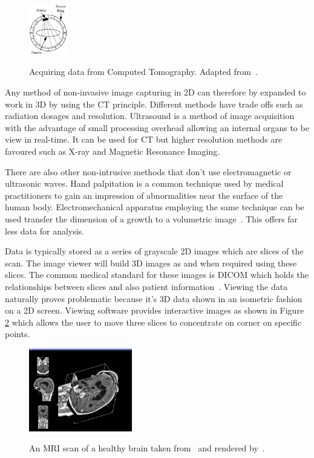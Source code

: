 \documentclass[journal]{IEEEtran}
\begin{document}
\begin{figure}[!htb]
   \centering
   \includegraphics[width = 0.15\textwidth]{Figures/CT.pdf}
   \label{fig:ct}
   \caption{Acquiring data from Computed Tomography. Adapted from~\cite{kayvan2006biomedical}.}
\end{figure}

Any method of non-invasive image capturing in 2D can therefore by expanded to work in 3D by using the CT principle.
Different methods have trade offs such as radiation dosages and resolution.
Ultrasound is a method of image acquisition with the advantage of small processing overhead allowing an internal organs to be view in real-time. 
It can be used for CT but higher resolution methods are favoured such as X-ray and Magnetic Resonance Imaging.

There are also other non-intrusive methods that don't use electromagnetic or ultrasonic waves.
Hand palpitation is a common technique used by medical practitioners to gain an impression of abnormalities near the surface of the human body. 
Electromechanical apparatus employing the same technique can be used transfer the dimension of a growth to a volumetric image~\cite{liu09haptic,wellman1997modeling}.  
This offers far less data for analysis.

Data is typically stored as a series of grayscale 2D images which are slices of the scan.
The image viewer will build 3D images as and when required using these slices.
The common medical standard for these images is DICOM which holds the relationships between slices and also patient information~\cite{dicom11nema}.
Viewing the data naturally proves problematic because it's 3D data shown in an isometric fashion on a 2D screen.
Viewing software provides interactive images as shown in Figure \ref{fig:3d} which allows the user to move three slices to concentrate on corner on specific points.

\begin{figure}[!htb]
   \centering
   \includegraphics[width = 0.4\textwidth]{Figures/3Dview.png}
   \label{fig:3d}
   \caption{An MRI scan of a healthy brain taken from~\cite{cia} and rendered by~\cite{slicer}.}
\end{figure}
\end{document}
